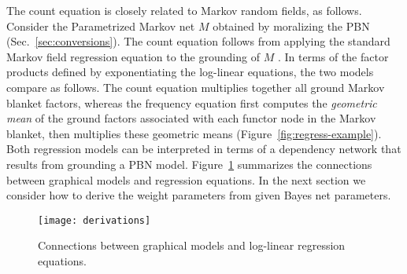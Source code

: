 \documentclass[twoside,leqno,twocolumn]{article}
\begin{document}
The count equation is closely related to Markov random fields, as follows. Consider the Parametrized Markov net $M$ obtained by moralizing the PBN (Sec.~\ref{sec:conversions}). The count equation follows from applying the standard Markov field regression equation to the grounding of $M$ \cite{Domingos2007}. 
%
In terms of the factor products defined by exponentiating the log-linear equations, the two models compare as follows. The count equation multiplies together all ground Markov blanket factors, whereas the frequency equation first computes the {\em geometric mean} of the ground factors associated with each functor node in the Markov blanket, then multiplies these geometric means (Figure~\ref{fig:regress-example}). Both regression models can be interpreted in terms of a dependency network that results from grounding a PBN model.
Figure~\ref{fig:derivations} summarizes the connections between graphical models and regression equations. In the next section we consider how to derive the weight parameters from given Bayes net parameters.

\begin{figure}[htbp]
\begin{center}
\texttt{[image: derivations]}
\caption{Connections between graphical models and log-linear regression equations. 
\label{fig:derivations}}
\end{center}
\end{figure}
\end{document}
